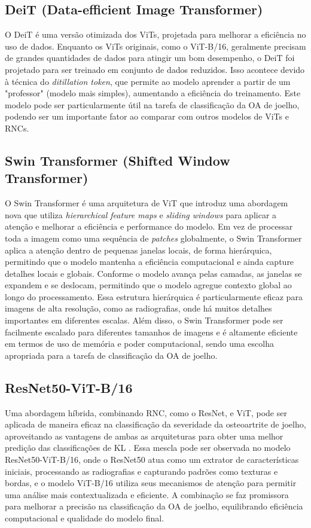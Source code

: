 \subsection{DeiT (Data-efficient Image Transformer)}

O DeiT \cite{Touvron2021} é uma versão otimizada dos ViTs, projetada para melhorar a eficiência no uso de dados. Enquanto os ViTs originais, como o ViT-B/16, geralmente precisam de grandes quantidades de dados para atingir um bom desempenho, o DeiT foi projetado para ser treinado em conjunto de dados reduzidos. Isso acontece devido à técnica do \textit{ditillation token}, que permite ao modelo aprender a partir de um "professor" (modelo mais simples), aumentando a eficiência do treinamento. Este modelo pode ser particularmente útil na tarefa de classificação da OA de joelho, podendo ser um importante fator ao comparar com outros modelos de ViTs e RNCs.

\subsection{Swin Transformer (Shifted Window Transformer)}

O Swin Transformer \cite{Liu2021} é uma arquitetura de ViT que introduz uma abordagem nova que utiliza \textit{hierarchical feature maps} e \textit{sliding windows} para aplicar a atenção e melhorar a eficiência e performance do modelo. Em vez de processar toda a imagem como uma sequência de \textit{patches} globalmente, o Swin Transformer aplica a atenção dentro de pequenas janelas locais, de forma hierárquica, permitindo que o modelo mantenha a eficiência computacional e ainda capture detalhes locais e globais. Conforme o modelo avança pelas camadas, as janelas se expandem e se deslocam, permitindo que o modelo agregue contexto global ao longo do processamento. Essa estrutura hierárquica é particularmente eficaz para imagens de alta resolução, como as radiografias, onde há muitos detalhes importantes em diferentes escalas. Além disso, o Swin Transformer pode ser facilmente escalado para diferentes tamanhos de imagens e é altamente eficiente em termos de uso de memória e poder computacional, sendo uma escolha apropriada para a tarefa de classificação da OA de joelho.

\subsection{ResNet50-ViT-B/16}

Uma abordagem híbrida, combinando RNC, como o ResNet, e ViT, pode ser aplicada de maneira eficaz na classificação da severidade da osteoartrite de joelho, aproveitando as vantagens de ambas as arquiteturas para obter uma melhor predição das classificações de KL \cite{Park2022, Wang2021}. Essa mescla pode ser observada no modelo ResNet50-ViT-B/16, onde o ResNet50 atua como um extrator de características iniciais, processando as radiografias e capturando padrões como texturas e bordas, e o modelo ViT-B/16 utiliza seus mecanismos de atenção para permitir uma análise mais contextualizada e eficiente. A combinação se faz promissora para melhorar a precisão na classificação da OA de joelho, equilibrando eficiência computacional e qualidade do modelo final.

